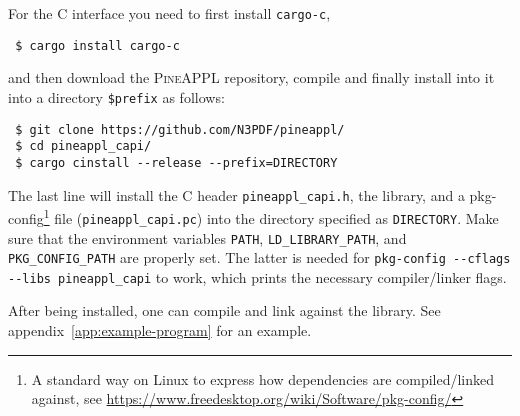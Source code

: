 For the C interface you need to first install \texttt{cargo-c},
\begin{verbatim}
 $ cargo install cargo-c
\end{verbatim}
and then download the \textsc{PineAPPL} repository, compile and finally install into it into a directory \texttt{\$prefix} as follows:
\begin{verbatim}
 $ git clone https://github.com/N3PDF/pineappl/
 $ cd pineappl_capi/
 $ cargo cinstall --release --prefix=DIRECTORY
\end{verbatim}
The last line will install the C header \texttt{pineappl\_capi.h}, the library, and a pkg-config\footnote{A standard way on Linux to express how dependencies are compiled/linked against, see \url{https://www.freedesktop.org/wiki/Software/pkg-config/}} file (\texttt{pineappl\_capi.pc}) into the directory specified as \texttt{DIRECTORY}.
Make sure that the environment variables \texttt{PATH}, \texttt{LD\_LIBRARY\_PATH}, and \texttt{PKG\_CONFIG\_PATH} are properly set.
The latter is needed for \texttt{pkg-config -{}-cflags -{}-libs pineappl\_capi} to work, which prints the necessary compiler/linker flags.

After being installed, one can compile and link against the library.
See appendix~\ref{app:example-program} for an example.
